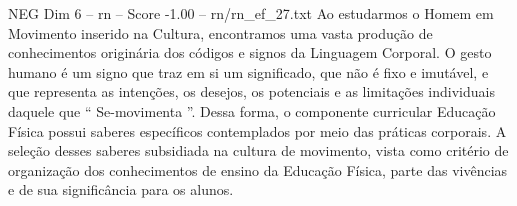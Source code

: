 \begin{textsample}{NEG Dim 6 – rn – Score -1.00 – rn/rn\_ef\_27.txt}
Ao estudarmos o Homem em Movimento inserido na Cultura, encontramos uma vasta produção de conhecimentos originária dos códigos e signos da Linguagem Corporal.
O gesto humano é um signo que traz em si um significado, que não é fixo e imutável, e que representa as intenções, os desejos, os potenciais e as limitações individuais daquele que “ Se-movimenta ”.
Dessa forma, o componente curricular Educação Física possui saberes específicos contemplados por meio das práticas corporais.
A seleção desses saberes subsidiada na cultura de movimento, vista como critério de organização dos conhecimentos de ensino da Educação Física, parte das vivências e de sua significância para os alunos.

\end{textsample}
